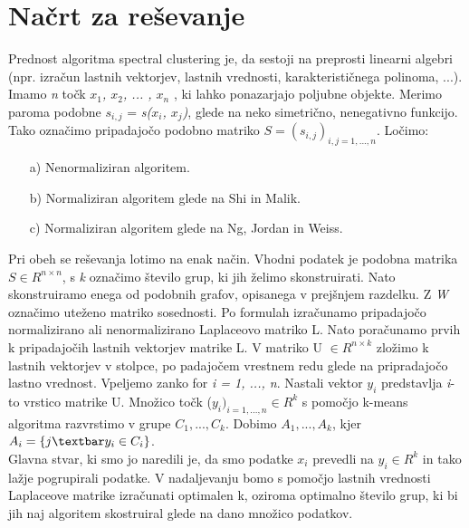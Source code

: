 \documentclass[a4paper, 10pt]{article}
\begin{document}
\section{Načrt za reševanje}
Prednost algoritma spectral clustering je, da sestoji na preprosti linearni algebri (npr. izračun lastnih vektorjev, lastnih vrednosti, karakterističnega polinoma, ...). Imamo \textsl{n} točk \textsl{$x_1$, $x_2$, ... , $x_n$ }, ki lahko ponazarjajo poljubne objekte. Merimo paroma podobne  \textsl{$s_{i,j}$} =  \textsl{s($x_i$, $x_j$)}, glede na neko simetrično, nenegativno funkcijo. Tako označimo pripadajočo podobno matriko $S=(s_{i,j})_{i,j = 1,..., n}$. Ločimo:
\begin{itemize}
\item[a)] Nenormaliziran algoritem.
\item[b)] Normaliziran algoritem glede na Shi in Malik.
\item[c)] Normaliziran algoritem glede na Ng, Jordan in Weiss.
\end{itemize}
Pri obeh se reševanja lotimo na enak način. Vhodni podatek je podobna matrika $S\in R^{n\times n}$, s  \textsl{k} označimo število grup, ki jih želimo skonstruirati. Nato skonstruiramo enega od podobnih grafov, opisanega v prejšnjem razdelku. Z \textsl{W} označimo uteženo matriko sosednosti. Po formulah izračunamo pripadajočo normalizirano ali nenormalizirano Laplaceovo matriko L. Nato poračunamo prvih k pripadajočih lastnih vektorjev matrike L. V matriko U $\in R^{n \times k}$ zložimo k lastnih vektorjev v stolpce, po padajočem vrestnem redu glede na pripradajočo lastno vrednost. Vpeljemo zanko for \textsl{i = 1, ..., n}. Nastali vektor $y_i$ predstavlja \textsl{i}-to vrstico matrike U. Množico točk ($y_i)_{i = 1, ..., n}\in R^k$ s pomočjo k-means algoritma razvrstimo v grupe $C_1, ..., C_k$. Dobimo $A_1, ..., A_k$, kjer $A_i=\{j\textbar y_i\in C_i\}$.\\
Glavna stvar, ki smo jo naredili je, da smo podatke $x_i$ prevedli na $y_i\in R^{k}$ in tako lažje pogrupirali podatke. V nadaljevanju bomo s pomočjo lastnih vrednosti Laplaceove matrike izračunati optimalen k, oziroma optimalno število grup, ki bi jih naj algoritem skostruiral glede na dano množico podatkov.\\
\end{document}
